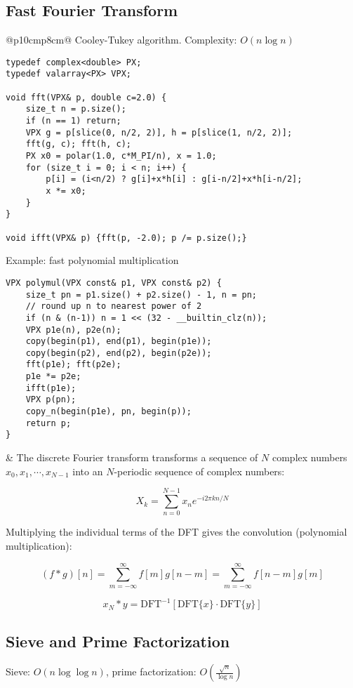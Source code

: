 \documentclass[letterpaper]{article}
\begin{document}
\subsection{Fast Fourier Transform}
\begin{tabular}{@{}p{10cm}p{8cm}@{}}
Cooley-Tukey algorithm. Complexity: $O\left(n\log n\right)$

\begin{lstlisting}
typedef complex<double> PX;
typedef valarray<PX> VPX;

void fft(VPX& p, double c=2.0) {
	size_t n = p.size();
	if (n == 1) return;
	VPX g = p[slice(0, n/2, 2)], h = p[slice(1, n/2, 2)];
	fft(g, c); fft(h, c);
	PX x0 = polar(1.0, c*M_PI/n), x = 1.0;
	for (size_t i = 0; i < n; i++) {
		p[i] = (i<n/2) ? g[i]+x*h[i] : g[i-n/2]+x*h[i-n/2];
		x *= x0;
	}
}

void ifft(VPX& p) {fft(p, -2.0); p /= p.size();}
\end{lstlisting}

Example: fast polynomial multiplication
\begin{lstlisting}
VPX polymul(VPX const& p1, VPX const& p2) {
	size_t pn = p1.size() + p2.size() - 1, n = pn;
	// round up n to nearest power of 2
	if (n & (n-1)) n = 1 << (32 - __builtin_clz(n));
	VPX p1e(n), p2e(n);
	copy(begin(p1), end(p1), begin(p1e));
	copy(begin(p2), end(p2), begin(p2e));
	fft(p1e); fft(p2e);
	p1e *= p2e;
	ifft(p1e);
	VPX p(pn);
	copy_n(begin(p1e), pn, begin(p));
	return p;
}
\end{lstlisting}
&
The discrete Fourier transform transforms a sequence of $N$ complex numbers $x_0,x_1,\cdots,x_{N-1}$ into an $N$-periodic sequence of complex numbers:

$$
X_k = \sum_{n=0}^{N-1} x_ne^{-i2\pi kn/N}
$$

Multiplying the individual terms of the DFT gives the convolution (polynomial multiplication):

$$
(f*g)[n] = \sum_{m=-\infty}^{\infty} f[m]g[n-m] = \sum_{m=-\infty}^{\infty} f[n-m]g[m]
$$

$$
x_N*y = \text{DFT}^{-1}\left[\text{DFT}\{x\}\cdot\text{DFT}\{y\}\right]
$$

\end{tabular}

\clearpage
\subsection{Sieve and Prime Factorization}

Sieve: $O\left(n\log\log n\right)$, prime factorization: $O\left(\frac{\sqrt n}{\log n}\right)$
\end{document}
